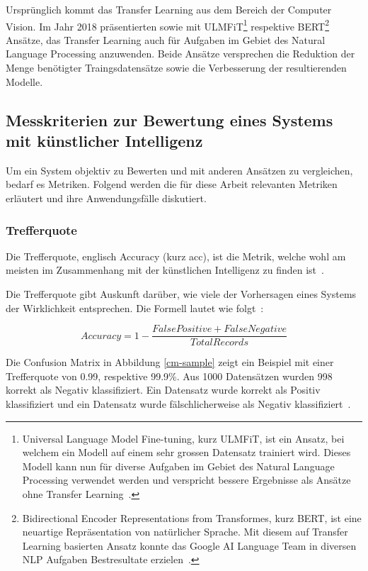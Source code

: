 Ursprünglich kommt das Transfer Learning aus dem Bereich der Computer Vision. Im Jahr 2018 präsentierten \textcite{Howard2018} sowie \textcite{Devlin2018} mit ULMFiT\footnote{Universal Language Model Fine-tuning, kurz ULMFiT, ist ein Ansatz, bei welchem ein Modell auf einem sehr grossen Datensatz trainiert wird. Dieses Modell kann nun für diverse Aufgaben im Gebiet des Natural Language Processing verwendet werden und verspricht bessere Ergebnisse als Ansätze ohne Transfer Learning~\autocite{Howard2018}.} respektive BERT\footnote{Bidirectional Encoder Representations from Transformes, kurz BERT, ist eine neuartige Repräsentation von natürlicher Sprache. Mit diesem auf Transfer Learning basierten Ansatz konnte das Google AI Language Team in diversen NLP Aufgaben Bestresultate erzielen~\autocite{Devlin2018}.} Ansätze, das Transfer Learning auch für Aufgaben im Gebiet des Natural Language Processing anzuwenden. Beide Ansätze versprechen die Reduktion der Menge benötigter Traingsdatensätze sowie die Verbesserung der resultierenden Modelle.

\newpage
\subsection{Messkriterien zur Bewertung eines Systems mit künstlicher Intelligenz}
\label{chap:metrices}

Um ein System objektiv zu Bewerten und mit anderen Ansätzen zu vergleichen, bedarf es Metriken. Folgend werden die für diese Arbeit relevanten Metriken erläutert und ihre Anwendungsfälle diskutiert.

\subsubsection{Trefferquote}

Die Trefferquote, englisch Accuracy (kurz acc), ist die Metrik, welche wohl am meisten im Zusammenhang mit der künstlichen Intelligenz zu finden ist~\autocite{TDSAccuracy}.

Die Trefferquote gibt Auskunft darüber, wie viele der Vorhersagen eines Systems der Wirklichkeit entsprechen. Die Formell lautet wie folgt~\autocite{TDSAccuracy}: 

\nopagebreak
$$Accuracy = 1 - \frac{False Positive + False Negative}{Total Records}$$
\vspace*{0.2cm}

Die Confusion Matrix in Abbildung \ref{cm-sample} zeigt ein Beispiel mit einer Trefferquote von 0.99, respektive 99.9\%. Aus 1000 Datensätzen wurden 998 korrekt als Negativ klassifiziert. Ein Datensatz wurde korrekt als Positiv klassifiziert und ein Datensatz wurde fälschlicherweise als Negativ klassifiziert~\autocite{TDSAccuracy}.

